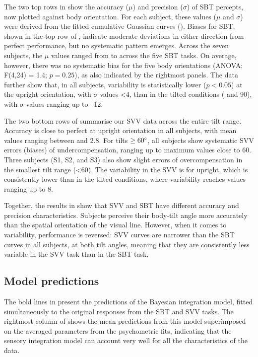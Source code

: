 The two top rows in  show the accuracy ($\mu$) and precision ($\sigma$) of SBT percepts, now plotted against body orientation. For each subject, these values ($\mu$ and $\sigma$) were derived from the fitted cumulative Gaussian curves (). Biases for SBT, shown in the top row of , indicate moderate deviations in either direction from perfect performance, but no systematic pattern emerges. Across the seven subjects, the $\mu$ values ranged from  to  across the five SBT tasks. On average, however, there was no systematic bias for the five body orientations (ANOVA; F(4,24) = 1.4; $p = 0.25$), as also indicated by the rightmost panels. The data further show that, in all subjects, variability is statistically lower ($p < 0.05$) at the upright orientation, with $\sigma$ values \textless4\textdegree, than in the tilted conditions ( and 90\textdegree), with $\sigma$ values ranging up to ~12\textdegree.

The two bottom rows of  summarise our SVV data across the entire tilt range. Accuracy is close to perfect at upright orientation in all subjects, with mean values ranging between  and 2.8\textdegree. For tilts $\ge60\degree$, all subjects show systematic SVV errors (biases) of undercompensation, ranging up to maximum values close to 60\textdegree. Three subjects (S1, S2, and S3) also show slight errors of overcompensation in the smallest tilt range (\textless60\textdegree). The variability in the SVV is  for upright, which is consistently lower than in the tilted conditions, where variability reaches values ranging up to 8\textdegree.

Together, the results in  show that SVV and SBT have different accuracy and precision characteristics. Subjects perceive their body-tilt angle more accurately than the spatial orientation of the visual line. However, when it comes to variability, performance is reversed: SVV curves are narrower than the SBT curves in all subjects, at both tilt angles, meaning that they are consistently less variable in the SVV task than in the SBT task.

\subsection{Model predictions}

The bold lines in  present the predictions of the Bayesian integration model, fitted simultaneously to the original responses from the SBT and SVV tasks. The rightmost column of  shows the mean predictions from this model superimposed on the averaged parameters from the psychometric fits, indicating that the sensory integration model can account very well for all the characteristics of the data.

